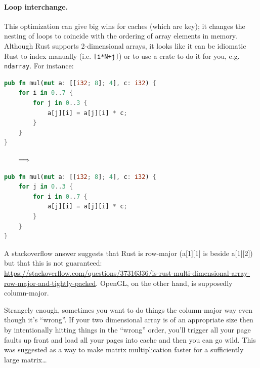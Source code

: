 \documentclass[a4paper]{report}
\begin{document}
\paragraph{Loop interchange.} This optimization can give big wins
for caches (which are key); it changes the nesting of loops to
coincide with the ordering of array elements in memory. Although Rust
supports 2-dimensional arrays, it looks like it can be idiomatic Rust to index
manually (i.e. \texttt{[i*N+j]}) or to use a crate to do it for you, e.g.
\texttt{ndarray}.
For instance:
\begin{center}
\vspace*{-1em}
\begin{minipage}{.39\textwidth}
  \begin{lstlisting}[language=Rust]
pub fn mul(mut a: [[i32; 8]; 4], c: i32) {
    for i in 0..7 {
        for j in 0..3 {
            a[j][i] = a[j][i] * c;
        }
    }
}
  \end{lstlisting}
  \end{minipage} $\hspace*{2em} \Longrightarrow \hspace*{2em}$ \begin{minipage}{.4\textwidth}
  \begin{lstlisting}[language=Rust]
pub fn mul(mut a: [[i32; 8]; 4], c: i32) {
    for j in 0..3 {
        for i in 0..7 {
            a[j][i] = a[j][i] * c;
        }
    }
}
  \end{lstlisting}
  \end{minipage}
  \end{center}
  A stackoverflow answer suggests that Rust is row-major
  (a[1][1] is beside a[1][2]) but that this is not
  guaranteed: {\scriptsize \url{https://stackoverflow.com/questions/37316336/is-rust-multi-dimensional-array-row-major-and-tightly-packed}}. OpenGL, on the other hand, is supposedly column-major.

Strangely enough, sometimes you want to do things the column-major way even though it's ``wrong''. If your two dimensional array is of an appropriate size then by intentionally hitting things in the ``wrong'' order, you'll trigger all your page faults up front and load all your pages into cache and then you can go wild. This was suggested as a way to make matrix multiplication faster for a sufficiently large matrix\ldots
\end{document}
